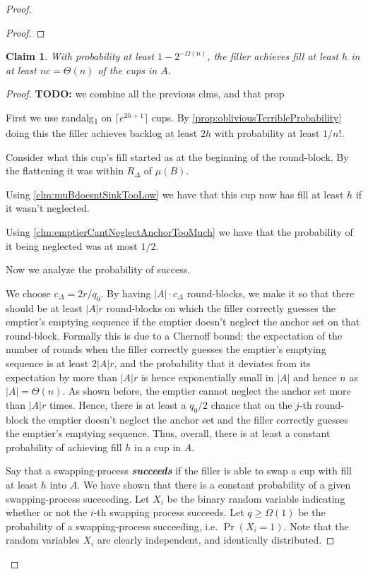 \documentclass[twocolumn]{article}[10pt]
\newcommand{\defn}[1]{{\textit{\textbf{\boldmath #1}}}\xspace}
\newcommand{\todo}[1]{{\color{red}\textbf{TODO:} #1}}
\newcommand{\randalg}{randalg\textsubscript{1}\xspace}
\newtheorem{clm}{Claim}
\begin{document}
\begin{proof}
\begin{proof}
\end{proof}

\begin{clm}
With probability at least $1-2^{-\Omega(n)}$, the filler achieves fill
at least $h$ in at least $nc = \Theta(n)$ of the cups in $A$. 
\end{clm}
\begin{proof}
  \todo{we combine all the previous clms, and that prop}

  First we use \randalg on $\lceil e^{2h+1} \rceil$ cups. By
  \cref{prop:obliviousTerribleProbability} doing this the filler achieves backlog
  at least $2h$ with probability at least $1/n!$.

  Consider what this cup's fill started as at the beginning of
  the round-block. By the flattening it was within $R_\Delta$ of
  $\mu(B)$.

  Using \cref{clm:muBdoesntSinkTooLow} we have that this cup now
  has fill at least $h$ if it wasn't neglected.

  Using \cref{clm:emptierCantNeglectAnchorTooMuch} we have that
  the probability of it being neglected was at most $1/2$.

  Now we analyze the probability of success.

  We choose $c_\Delta = 2r/q_0.$ By having $|A|\cdot c_\Delta$
  round-blocks, we make it so that there should be at least $|A|r$
  round-blocks on which the filler correctly guesses the emptier's emptying
  sequence if the emptier doesn't neglect the anchor set on that
  round-block. Formally this is due to a Chernoff bound: the expectation of the
  number of rounds when the filler correctly guesses the emptier's emptying
  sequence is at least $2|A|r$, and the probability that it deviates from
  its expectation by more than $|A|r$ is hence exponentially small in $|A|$
  and hence $n$ as $|A| =\Theta(n)$. As shown before, the emptier cannot
  neglect the anchor set more than $|A|r$ times. Hence, there
  is at least a $q_0/2$ chance that on the $j$-th round-block the
  emptier doesn't neglect the anchor set and the filler correctly guesses
  the emptier's emptying sequence. Thus, overall, there is at least
  a constant probability of achieving fill $h$ in a cup in $A$.

  Say that a swapping-process \defn{succeeds} if the filler is able to swap a
  cup with fill at least $h$ into $A$. We have shown that there is a constant
  probability of a given swapping-process succeeding. Let $X_i$ be the binary
  random variable indicating whether or not the $i$-th swapping process
  succeeds. Let $q \ge \Omega(1)$ be the probability of a swapping-process
  succeeding, i.e. $\Pr(X_i=1)$. Note that the random variables $X_i$ are clearly
  independent, and identically distributed.


\end{proof}
\end{proof}
\end{document}
